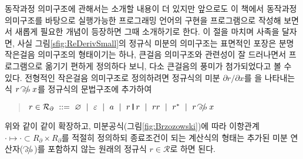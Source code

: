 \begin{comment}
{
\newcommand{\simpRE}[0]{\mathrlap{~~^{\,_\mathfrak{s}}}\longmapsto}
\begin{multline}
a\\
\varnothing \VERT r \simpRE r \\
r \VERT \varnothing \simpRE r \\
\varnothing\,r \simpRE \varnothing \\
r\,\varnothing \simpRE \varnothing \\
\varepsilon\,r \simpRE r \\
r\,\varepsilon \simpRE r \\
\varnothing^{*} \simpRE \varepsilon \\
\varepsilon^{*} \simpRE \varepsilon \\
\inference{r_1\simpRE r_1'}{r_1 \VERT r_2 \simpRE r_1'\VERT r_2 } \\
\inference{r_2\simpRE r_2'}{r_1 \VERT r_2 \simpRE r_1 \VERT r_2'} \\
\inference{r_1\simpRE r_1'}{r_1\,r_2 \simpRE r_1' r_2 } \\
\inference{r_2\simpRE r_2'}{r_1\,r_2 \simpRE r_1\,r_2'} \\
\inference{r\simpRE r'}{r^{*} \simpRE r'^{*}} \\
b
\end{multline}
}
\end{comment}

동작과정 의미구조에 관해서는 소개할 내용이 더 있지만 앞으로도
이 책에서 동작과정 의미구조를 바탕으로 실행가능한 프로그래밍 언어의
구현을 프로그램으로 작성해 보면서 새롭게 필요한 개념이 등장하면
그때 소개하기로 한다. 이 절을 마치며 사족을 달자면, 사실
그림\;\ref{sfig:ReDerivSmall}의 정규식 미분의 의미구조는
표면적인 포장은 분명 작은걸음 의미구조의 형태이기는 하나,
큰걸음 의미구조와 관련성이 잘 드러나면서 프로그램으로 옮기기
편하게 정의하다 보니, 다소 큰걸음의 풍미가 첨가되었다고 볼 수 있다.
전형적인 작은걸음 의미구조로 정의하려면 정규식의 미분
$\partial r/\partial x$를 을 나타내는 식 $r \pdvinfix x$를
정규식의 문법구조에 추가하여
\begin{quote}
$r\in \mathcal{R}_{\partial} ~::=~
 \varnothing ~\mid~ \varepsilon ~\mid~ a ~\mid~
 r\VERT r ~\mid~ rr ~\mid~ r^{*} ~\mid~ r \pdvinfix x$
\end{quote}
위와 같이 같이 확장하고,
미분공식(그림\;\ref{fig:Brzozowski})에 따라 이항관계
$\cdot\!\longmapsto\!\cdot \subset R_{\partial}\times R_{\partial}$를
적절히 정의하되 종료조건이 되는 계산식의 형태는
추가된 미분 연산자($\pdvinfix$)를 포함하지 않는
원래의 정규식 $r\in \mathcal{R}$로 하면 된다.

